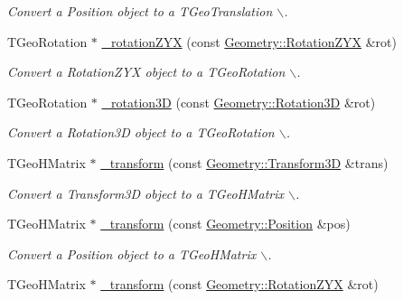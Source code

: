 \begin{DoxyCompactItemize}
\begin{DoxyCompactList}\small\item\em Convert a Position object to a TGeoTranslation $\backslash$. \item\end{DoxyCompactList}\item 
TGeoRotation $\ast$ \hyperlink{group___d_d4_h_e_p___g_e_o_m_e_t_r_y_gac468c0a81631e0a1c052094131f9d680}{\_\-rotationZYX} (const \hyperlink{namespace_d_d4hep_1_1_geometry_a24667b2b9c3cec3d5239828db4d52189}{Geometry::RotationZYX} \&rot)
\begin{DoxyCompactList}\small\item\em Convert a RotationZYX object to a TGeoRotation $\backslash$. \item\end{DoxyCompactList}\item 
TGeoRotation $\ast$ \hyperlink{group___d_d4_h_e_p___g_e_o_m_e_t_r_y_ga1dc4cc8b92d11d2fc874ed142c7b1bbc}{\_\-rotation3D} (const \hyperlink{namespace_d_d4hep_1_1_geometry_a022fecb763315fa2bf39cbb648944a0e}{Geometry::Rotation3D} \&rot)
\begin{DoxyCompactList}\small\item\em Convert a Rotation3D object to a TGeoRotation $\backslash$. \item\end{DoxyCompactList}\item 
TGeoHMatrix $\ast$ \hyperlink{group___d_d4_h_e_p___g_e_o_m_e_t_r_y_ga01d65a905944a17404358ea0116d4dd3}{\_\-transform} (const \hyperlink{namespace_d_d4hep_1_1_geometry_aeb4c0356d12fd7be49a0aae50514e64b}{Geometry::Transform3D} \&trans)
\begin{DoxyCompactList}\small\item\em Convert a Transform3D object to a TGeoHMatrix $\backslash$. \item\end{DoxyCompactList}\item 
TGeoHMatrix $\ast$ \hyperlink{group___d_d4_h_e_p___g_e_o_m_e_t_r_y_ga543149f9fccc6961eb19ab307f96e192}{\_\-transform} (const \hyperlink{namespace_d_d4hep_1_1_geometry_a55083902099d03506c6db01b80404900}{Geometry::Position} \&pos)
\begin{DoxyCompactList}\small\item\em Convert a Position object to a TGeoHMatrix $\backslash$. \item\end{DoxyCompactList}\item 
TGeoHMatrix $\ast$ \hyperlink{group___d_d4_h_e_p___g_e_o_m_e_t_r_y_gaf3a07560a5302fbb20eed5a933e611d8}{\_\-transform} (const \hyperlink{namespace_d_d4hep_1_1_geometry_a24667b2b9c3cec3d5239828db4d52189}{Geometry::RotationZYX} \&rot)

\end{DoxyCompactItemize}

